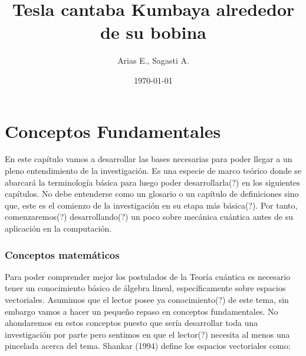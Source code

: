 \documentclass[11pt,a4paper]{article}
\author{Arias E., Sagasti A.}
\date{\today}
\title{Tesla cantaba Kumbaya alrededor de su bobina}
\begin{document}
\begin{titlepage}
\maketitle
\end{titlepage}
\part{Conceptos Fundamentales}
En este capítulo vamos a desarrollar las bases necesarias para poder llegar a un pleno entendimiento de la investigación. Es una especie de marco teórico donde se abarcará la terminología básica para luego poder desarrollarla(?) en los siguientes capítulos. No debe entenderse como un glosario o un capítulo de definiciones sino que, este es el comienzo de la investigación en su etapa más básica(?). Por tanto, comenzaremos(?) desarrollando(?) un poco sobre mecánica cuántica antes de su aplicación en la computación.

\section*{Conceptos matemáticos}
Para poder comprender mejor los postulados de la Teoría cuántica es necesario tener un conocimiento básico de álgebra lineal, específicamente sobre espacios vectoriales. Asumimos que el lector posee ya conocimiento(?) de este tema, sin embargo vamos a hacer un pequeño repaso en conceptos fundamentales. No ahondaremos en estos conceptos puesto que sería desarrollar toda una investigación por parte pero sentimos en que el lector(?) necesita al menos una pincelada acerca del tema.
Shankar (1994) define los espacios vectoriales como:
\end{document}
